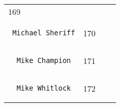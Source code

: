 \documentclass[]{article}
\begin{document}
\begin{longtable}[c]{@{}llll@{}}
\begin{minipage}[t]{0.10\columnwidth}
169
\end{minipage} & \begin{minipage}[t]{0.13\columnwidth}\raggedright
\end{minipage} & \begin{minipage}[t]{0.15\columnwidth}\raggedright
\end{minipage}
\\\noalign{\medskip}
\begin{minipage}[t]{0.39\columnwidth}\raggedright
\begin{verbatim}
 Michael Sheriff
\end{verbatim}
\end{minipage} & \begin{minipage}[t]{0.10\columnwidth}\raggedright
170
\end{minipage} & \begin{minipage}[t]{0.13\columnwidth}\raggedright
\end{minipage} & \begin{minipage}[t]{0.15\columnwidth}\raggedright
\end{minipage}
\\\noalign{\medskip}
\begin{minipage}[t]{0.39\columnwidth}\raggedright
\begin{verbatim}
  Mike Champion
\end{verbatim}
\end{minipage} & \begin{minipage}[t]{0.10\columnwidth}\raggedright
171
\end{minipage} & \begin{minipage}[t]{0.13\columnwidth}\raggedright
\end{minipage} & \begin{minipage}[t]{0.15\columnwidth}\raggedright
\end{minipage}
\\\noalign{\medskip}
\begin{minipage}[t]{0.39\columnwidth}\raggedright
\begin{verbatim}
  Mike Whitlock
\end{verbatim}
\end{minipage} & \begin{minipage}[t]{0.10\columnwidth}\raggedright
172
\end{minipage} & \begin{minipage}[t]{0.13\columnwidth}\raggedright
\end{minipage} & \begin{minipage}[t]{0.15\columnwidth}\raggedright

\end{minipage}
\end{longtable}
\end{document}
